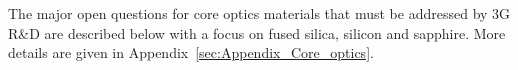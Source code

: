 The major open questions for core optics materials that must be addressed by 3G R\&D are described below with a focus on fused silica, silicon and sapphire. More details are given in Appendix~\ref{sec:Appendix_Core_optics}.





 

